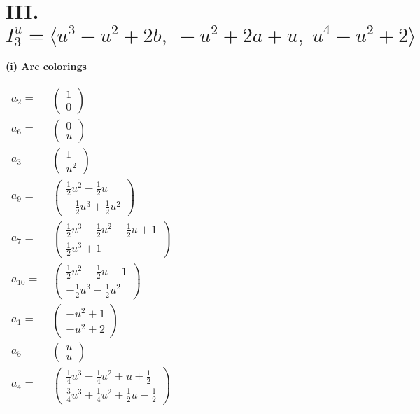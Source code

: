 \documentclass[1p]{elsarticle_modified}
\theoremstyle{definition}
\begin{document}
\centering \section*{III. $I^u_{3}= \langle u^3- u^2+2 b,\;- u^2+2 a+u,\;u^4- u^2+2 \rangle$}
\flushleft \textbf{(i) Arc colorings}\\
\begin{tabular}{m{7pt} m{180pt} m{7pt} m{180pt} }
\flushright $a_{2}=$&$\begin{pmatrix}1\\0\end{pmatrix}$ \\
\flushright $a_{6}=$&$\begin{pmatrix}0\\u\end{pmatrix}$ \\
\flushright $a_{3}=$&$\begin{pmatrix}1\\u^2\end{pmatrix}$ \\
\flushright $a_{9}=$&$\begin{pmatrix}\frac{1}{2} u^2-\frac{1}{2} u\\-\frac{1}{2} u^3+\frac{1}{2} u^2\end{pmatrix}$ \\
\flushright $a_{7}=$&$\begin{pmatrix}\frac{1}{2} u^3-\frac{1}{2} u^2-\frac{1}{2} u+1\\\frac{1}{2} u^3+1\end{pmatrix}$ \\
\flushright $a_{10}=$&$\begin{pmatrix}\frac{1}{2} u^2-\frac{1}{2} u-1\\-\frac{1}{2} u^3-\frac{1}{2} u^2\end{pmatrix}$ \\
\flushright $a_{1}=$&$\begin{pmatrix}- u^2+1\\- u^2+2\end{pmatrix}$ \\
\flushright $a_{5}=$&$\begin{pmatrix}u\\u\end{pmatrix}$ \\
\flushright $a_{4}=$&$\begin{pmatrix}\frac{1}{4} u^3-\frac{1}{4} u^2+u+\frac{1}{2}\\\frac{3}{4} u^3+\frac{1}{4} u^2+\frac{1}{2} u-\frac{1}{2}\end{pmatrix}$ \\

\end{tabular}
\end{document}
